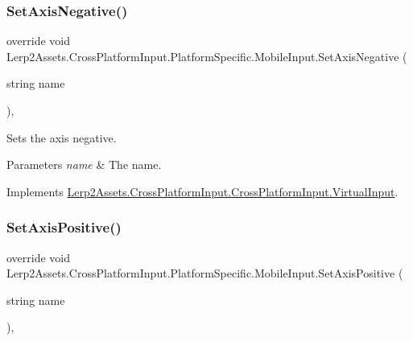 \subsubsection{\texorpdfstring{Set\+Axis\+Negative()}{SetAxisNegative()}}
{\footnotesize\ttfamily override void Lerp2\+Assets.\+Cross\+Platform\+Input.\+Platform\+Specific.\+Mobile\+Input.\+Set\+Axis\+Negative (\begin{DoxyParamCaption}\item[{string}]{name }\end{DoxyParamCaption})\hspace{0.3cm}{\ttfamily [inline]}, {\ttfamily [virtual]}}



Sets the axis negative. 


\begin{DoxyParams}{Parameters}
{\em name} & The name.\\
\hline
\end{DoxyParams}


Implements \hyperlink{class_lerp2_assets_1_1_cross_platform_input_1_1_cross_platform_input_1_1_virtual_input_af420a2c8478dd23fd7ecc2ba035eeb88}{Lerp2\+Assets.\+Cross\+Platform\+Input.\+Cross\+Platform\+Input.\+Virtual\+Input}.

\mbox{\label{class_lerp2_assets_1_1_cross_platform_input_1_1_platform_specific_1_1_mobile_input_a3ad0a492b131832757f0877e3a599a4d}} 
\subsubsection{\texorpdfstring{Set\+Axis\+Positive()}{SetAxisPositive()}}
{\footnotesize\ttfamily override void Lerp2\+Assets.\+Cross\+Platform\+Input.\+Platform\+Specific.\+Mobile\+Input.\+Set\+Axis\+Positive (\begin{DoxyParamCaption}\item[{string}]{name }\end{DoxyParamCaption})\hspace{0.3cm}{\ttfamily [inline]}, {\ttfamily [virtual]}}



